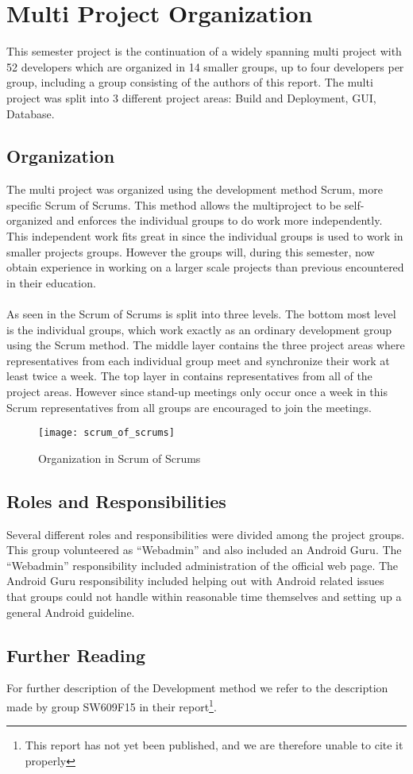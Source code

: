 
\section{Multi Project Organization}
\label{sec:multi_project_organization}

This semester project is the continuation of a widely spanning multi project with 52 developers which are organized in 14 smaller groups, up to four developers per group, including a group consisting of the authors of this report. The multi project was split into 3 different project areas: Build and Deployment, GUI, Database. 

\subsection{Organization}
The multi project was organized using the development method Scrum\parencite{scrum}, more specific Scrum of Scrums. This method allows the multiproject to be self-organized and enforces the individual groups to do work more independently. This independent work fits great in since the individual groups is used to work in smaller projects groups. However the groups will, during this semester, now obtain experience in working on a larger scale projects than previous encountered in their education. 
\\\\
As seen in  the Scrum of Scrums is split into three levels. The bottom most level is the individual groups, which work exactly as an ordinary development group using the Scrum method. The middle layer contains the three project areas where representatives from each individual group meet and synchronize their work at least twice a week. The top layer in  contains representatives from all of the project areas. However since stand-up meetings only occur once a week in this Scrum representatives from all groups are encouraged to join the meetings.

\begin{figure}[!htbp]
  \centering
    \texttt{[image: scrum\_of\_scrums]}
    \caption{Organization in Scrum of Scrums}
    \label{fig:scrum_of_scrums}
\end{figure}


\subsection{Roles and Responsibilities}
Several different roles and responsibilities were divided among the project groups. This group volunteered as ``Webadmin'' and also included an Android Guru. The ``Webadmin'' responsibility included administration of the official \giraf web page. The Android Guru responsibility included helping out with Android related issues that groups could not handle within reasonable time themselves and setting up a general Android guideline. 

\subsection{Further Reading}
For further description of the \giraf Development method we refer to the description made by group SW609F15 in their report\footnote{This report has not yet been published, and we are therefore unable to cite it properly}.